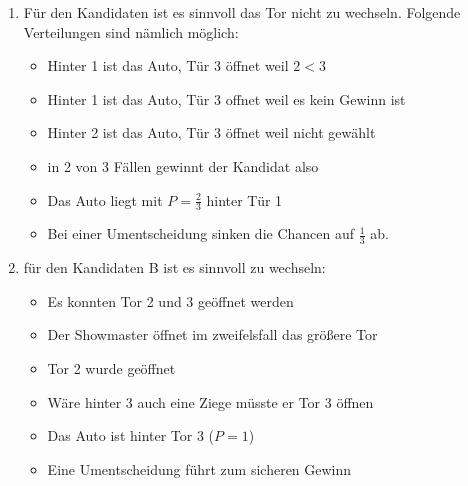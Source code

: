\begin{enumerate}
	\item Für den Kandidaten ist es sinnvoll das Tor nicht zu wechseln. Folgende Verteilungen sind nämlich möglich:
	\begin{itemize}
		\item Hinter 1 ist das Auto, Tür 3 öffnet weil $ 2<3$ 
		\item Hinter 1 ist das Auto, Tür 3 offnet weil es kein Gewinn ist
		\item Hinter 2 ist das Auto, Tür 3 öffnet weil nicht gewählt 
		\item in 2 von 3 Fällen gewinnt der Kandidat also 
		\item Das Auto liegt mit \(P= \frac{2}{3} \) hinter Tür 1
		\item Bei einer Umentscheidung sinken die Chancen auf \( \frac{1}{3}\) ab.
	\end{itemize}

	\item für den Kandidaten B ist es sinnvoll zu wechseln:
	\begin{itemize}
		\item Es konnten Tor 2 und 3 geöffnet werden
		\item Der Showmaster öffnet im zweifelsfall das größere Tor
		\item Tor 2 wurde geöffnet
		\item Wäre hinter 3 auch eine Ziege müsste er Tor 3 öffnen
		\item Das Auto ist hinter Tor 3 ($P=1$)
		\item Eine Umentscheidung führt zum sicheren Gewinn
	\end{itemize}
\end{enumerate}

